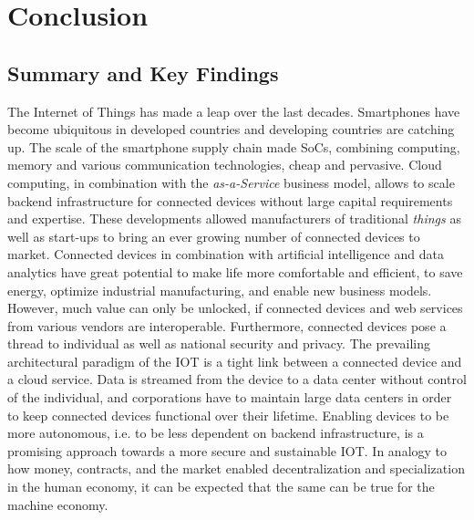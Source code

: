 \chapter{Conclusion}
\label{sec:discussion}

\section{Summary and Key Findings}

The Internet of Things has made a leap over the last decades. Smartphones have become ubiquitous in developed countries and developing countries are catching up. The scale of the smartphone supply chain made \ac{SoC}s, combining computing, memory and various communication technologies, cheap and pervasive. Cloud computing, in combination with the \emph{as-a-Service} business model, allows to scale backend infrastructure for connected devices without large capital requirements and expertise. These developments allowed manufacturers of traditional \emph{things} as well as start-ups to bring an ever growing number of connected devices to market. Connected devices in combination with artificial intelligence and data analytics have great potential to make life more comfortable and efficient, to save energy, optimize industrial manufacturing, and enable new business models. However, much value can only be unlocked, if connected devices and web services from various vendors are interoperable. Furthermore, connected devices pose a thread to individual as well as national security and privacy. 
The prevailing architectural paradigm of the \ac{IOT} is a tight link between a connected device and a cloud service. Data is streamed from the device to a data center without control of the individual, and corporations have to maintain large data centers in order to keep connected devices functional over their lifetime. 
Enabling devices to be more autonomous, i.e. to be less dependent on backend infrastructure, is a promising approach towards a more secure and sustainable \ac{IOT}. In analogy to how money, contracts, and the market enabled decentralization and specialization in the human economy, it can be expected that the same can be true for the machine economy. 

